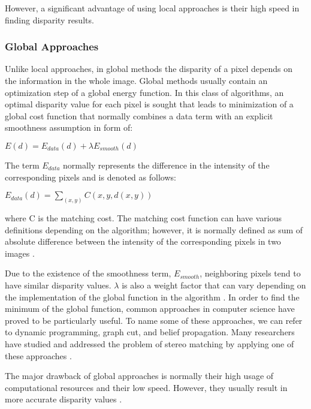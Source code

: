 \documentclass[dvips,letterpaper,12pt]{report}
\begin{document}
However, a significant advantage of using local approaches is their high speed in finding disparity results.\newline

\subsubsection{Global Approaches}
\newline
Unlike local approaches, in global methods the disparity of a pixel depends on the information in
the whole image. Global methods usually contain an optimization step of a global energy
function\cite{roy98,bobi99,boyk01}. In this class of algorithms, an optimal disparity value for each pixel is sought that leads to minimization of a global cost
function that normally combines a data term with an explicit smoothness assumption in form of:

\begin{center}
$E(d)=E_{data}(d)+\lambda E_{smooth}(d)$
\end{center}
The term $E_{data}$ normally represents the difference in the intensity of the corresponding pixels and is denoted as follows:

\begin{center}
$E_{data}(d) = \sum_{(x,y)}C(x,y,d(x,y))$
\end{center}

where C is the matching cost. The matching cost function can have various definitions depending on the algorithm; however, it is normally defined as sum of absolute difference 
between the intensity of the corresponding pixels in two images \cite{sch02}.

Due to the existence of the smoothness term, $E_{smooth}$, neighboring pixels tend to have similar disparity values. $\lambda$ is also a weight factor that can vary depending 
on the implementation of the global function in the algorithm \cite{sze11}.
In order to find the minimum of the global function, common approaches in computer science have proved to be particularly useful. 
To name some of these approaches, we can refer to dynamic programming, graph cut, and belief propagation. Many researchers have studied and addressed the problem of stereo matching
by applying one of these approaches \cite{sch02,boy01,boy04,kim05,sun11}.

The major drawback of global approaches is normally their high usage of computational resources and their low speed. However, 
they usually result in more accurate disparity values \cite{hirsch02,sze11}. 
\end{document}
